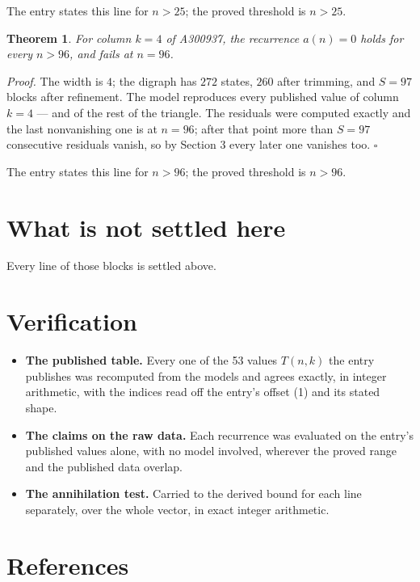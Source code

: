 \documentclass[11pt]{article}
\newtheorem{theorem}{Theorem}
\theoremstyle{definition}
\begin{document}
The entry states this line for $n > 25$; the proved threshold is $n > 25$.

\begin{theorem} For column $k = 4$ of A300937, the recurrence $a(n) = 0$ holds for every $n > 96$, and fails at $n = 96$.\end{theorem}

{\itshape Proof.} The width is $4$; the digraph has $272$ states, $260$ after trimming, and $S = 97$ blocks after refinement. The model reproduces every published value of column $k = 4$ --- and of the rest of the triangle. The residuals were computed exactly and the last nonvanishing one is at $n = 96$; after that point more than $S = 97$ consecutive residuals vanish, so by Section 3 every later one vanishes too. $\square$

The entry states this line for $n > 96$; the proved threshold is $n > 96$.

\section{What is not settled here}

Every line of those blocks is settled above.

\section{Verification}

\begin{itemize}

\item {\bfseries The published table.} Every one of the 53 values $T(n,k)$ the entry publishes was recomputed from the models and agrees exactly, in integer arithmetic, with the indices read off the entry's offset (1) and its stated shape.

\item {\bfseries The claims on the raw data.} Each recurrence was evaluated on the entry's published values alone, with no model involved, wherever the proved range and the published data overlap.

\item {\bfseries The annihilation test.} Carried to the derived bound for each line separately, over the whole vector, in exact integer arithmetic.

\end{itemize}

\section{References}
\end{document}
